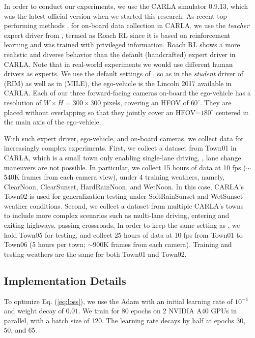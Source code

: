 In order to conduct our experiments, we use the CARLA simulator \cite{Dosovitskiy:2017} 0.9.13, which was the latest official version when we started this research. 
As recent top-performing methods \cite{Hu:2022}, for on-board data collection in CARLA, we use the \emph{teacher} expert driver from \cite{Zhang:2021}, termed as Roach RL since it is based on reinforcement learning and was trained with privileged information. 
Roach RL shows a more realistic and diverse behavior than the default (handcrafted) expert driver in CARLA. 
Note that in real-world experiments we would use different human drivers as experts. 
We use the default settings of \cite{Zhang:2021}, so as in the \emph{student} driver of \cite{Zhang:2021} (RIM) as well as in \cite{Hu:2022} (MILE), the ego-vehicle is the Lincoln 2017 available in CARLA. 
Each of our three forward-facing cameras on-board the ego-vehicle has a resolution of $W\times H=300\times300$ pixels, covering an HFOV of $60^{\circ}$. 
They are placed without overlapping so that they jointly cover an HFOV=$180^{\circ}$ centered in the main axis of the ego-vehicle. 


With such expert driver, ego-vehicle, and on-board cameras, we collect data for increasingly complex experiments. 
First, we collect a dataset from Town01 in CARLA, which is a small town only enabling single-lane driving, {\ie}, lane change maneuvers are not possible. 
In particular, we collect 15 hours of data at 10 fps ($\sim$540K frames from each camera view), under 4 training weathers, namely, ClearNoon, ClearSunset, HardRainNoon, and WetNoon. 
In this case, CARLA's Town02 is used for generalization testing under SoftRainSunset and WetSunset weather conditions. 
Second, we collect a dataset from multiple CARLA's towns to include more complex scenarios such as multi-lane driving, entering and exiting highways, passing crossroads, {\etc} In order to keep the same setting as \cite{Hu:2022}, we hold Town05 for testing, and collect 25 hours of data at 10 fps from Town01 to Town06 (5 hours per town; $\sim$900K frames from each camera). 
Training and testing weathers are the same for both Town01 and Town02. 



\subsection{Implementation Details}
To optimize Eq. (\ref{eq:loss}), we use the Adam \cite{Kingma:2015} with an initial learning rate of $10^{-4}$ and weight decay of $0.01$. 
We train for 80 epochs on 2 NVIDIA A40 GPUs in parallel, with a batch size of 120. 
The learning rate decays by half at epochs 30, 50, and 65. 


